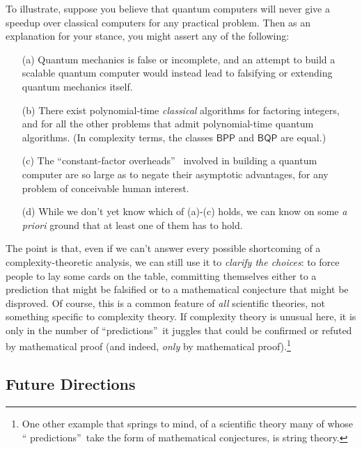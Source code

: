 \documentclass[12pt,onecolumn]{article}%
\begin{document}
To illustrate, suppose you believe that quantum computers will never give a
speedup over classical computers for any practical problem. Then as an
explanation for your stance, you might assert any of the following:

\begin{enumerate}
\item[(a)] Quantum mechanics is false or incomplete, and an attempt to build a
scalable quantum computer would instead lead to falsifying or extending
quantum mechanics itself.

\item[(b)] There exist polynomial-time \textit{classical} algorithms for
factoring integers, and for all the other problems that admit polynomial-time
quantum algorithms. (In complexity terms, the classes $\mathsf{BPP}$ and
$\mathsf{BQP}$ are equal.)

\item[(c)] The \textquotedblleft constant-factor overheads\textquotedblright\ %
 involved in building a quantum computer are so large as to negate their
asymptotic advantages, for any problem of conceivable human interest.

\item[(d)] While we don't yet know which of (a)-(c) holds, we can know on some
\textit{a priori} ground that at least one of them has to hold.
\end{enumerate}

The point is that, even if we can't answer every possible shortcoming of a
complexity-theoretic analysis, we can still use it to \textit{clarify the
choices}: to force people to lay some cards on the table, committing
themselves either to a prediction that might be falsified or to a mathematical
conjecture that might be disproved. Of course, this is a common feature of
\textit{all} scientific theories, not something specific to complexity theory.
 If complexity theory is unusual here, it is only in the number of
\textquotedblleft predictions\textquotedblright\  it juggles that could be
confirmed or refuted by mathematical proof (and indeed, \textit{only} by
mathematical proof).\footnote{One other example that springs to mind, of a
scientific theory many of whose \textquotedblleft
predictions\textquotedblright\  take the form of mathematical conjectures, is
string theory.}

\subsection{Future Directions\label{FUTURE}}
\end{document}
